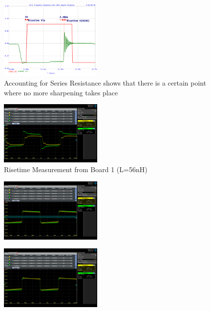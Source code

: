 \documentclass[journal]{IEEEtran}
\begin{document}
\begin{figure}[htb]
\centering
\includegraphics[width=0.45\textwidth]{Probed_Input_N10_N240_NoSeriesResistance}
\caption{Accounting for Series Resistance shows that there is a certain point where no more sharpening takes place}
\label{fig:probedWithResistance}
\end{figure}


\begin{figure}[htb]
\centering
\includegraphics[width=0.45\textwidth]{MeasuredSquareResponseB1.png}
\caption{Risetime Measurement from Board 1 (L=56nH)}
\label{fig:MeasuredSquareGeneric}
\end{figure}

\begin{figure}[htb]
\centering
\includegraphics[width=0.45\textwidth]{MeasuredSquare1VBiasB1.png}
\caption{}
\label{fig:MeasuredSquare1VBiasB1}
\end{figure}

\begin{figure}[htb]
\centering
\includegraphics[width=0.45\textwidth]{MeasuredSquare2VBiasB1.png}
\caption{}
\label{fig:Measured Risetime with 2V DC Bias}
\end{figure}
\end{document}
